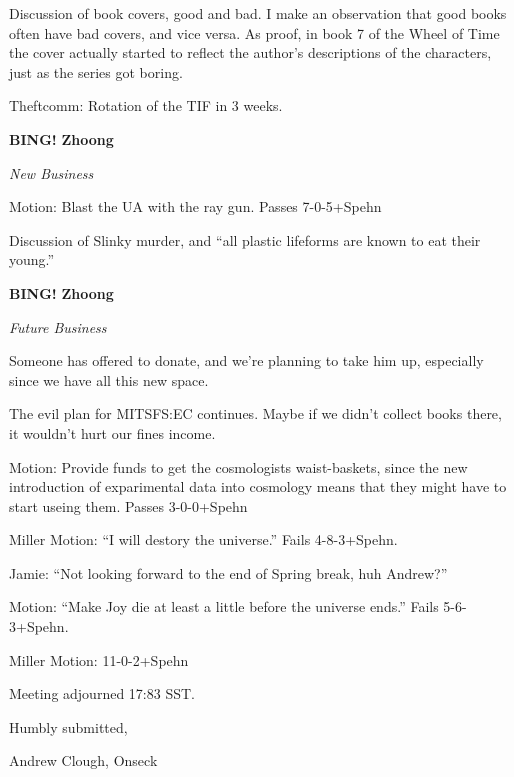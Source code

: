 \documentclass[12pt]{article}
\newcommand{\bing}{{\bf BING!} }
\begin{document}
Discussion of book covers, good and bad.  I make an observation that good books often have bad covers, and vice versa.  As proof, in book 7 of the Wheel of Time the cover actually started to reflect the author's descriptions of the characters, just as the series got boring.

Theftcomm:  Rotation of the TIF in 3 weeks.

\bing
{\bf Zhoong}
\begin{center}
\textit{New Business}
\end{center}

Motion:  Blast the UA with the ray gun.  Passes 7-0-5+Spehn

Discussion of Slinky murder, and ``all plastic lifeforms are known to eat their young.''

\bing
{\bf Zhoong}
\begin{center}
\textit{Future Business}
\end{center}

Someone has offered to donate, and we're planning to take him up, especially since we have all this new space.

The evil plan for MITSFS:EC continues.  Maybe if we didn't collect books there, it wouldn't hurt our fines income.

Motion:  Provide funds to get the cosmologists waist-baskets, since the new introduction of exparimental data into cosmology means that they might have to start useing them.  Passes 3-0-0+Spehn

Miller Motion:  ``I will destory the universe.''  Fails 4-8-3+Spehn.

Jamie: ``Not looking forward to the end of Spring break, huh Andrew?''

Motion: ``Make Joy die at least a little before the universe ends.''  Fails 5-6-3+Spehn.

Miller Motion:  11-0-2+Spehn 

\vspace{12pt}

\noindent
Meeting adjourned 17:83 SST.

\vspace{18pt}

\centerline{Humbly submitted,}
\centerline{Andrew Clough, Onseck}
\end{document}
